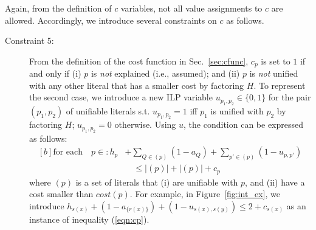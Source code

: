 \documentclass[english]{jnlp_1.4}
\def\P{}
\def\E{}
\def\U{}
\begin{document}
Again, from the definition of $c$ variables, not all value assignments
to $c$ are allowed.
\mbox{Accordingly,} we introduce several constraints on $c$ as follows.
\begin{description}
\item[Constraint 5:] From the definition of the cost function in
  Sec.~\ref{sec:cfunc}, $c_p$ is set to $1$ if and only if (i) $p$ is
  \emph{not} explained (i.e., assumed); and (ii) $p$ is \emph{not}
  unified with any other literal that has a smaller cost by
  factoring $H$. To represent the second case, we introduce a new
  ILP variable $u_{p_1,p_2} \in \{0,1\}$ for the pair $(p_1, p_2)$ of
  unifiable literals s.t. $u_{p_1,p_2} = 1$ iff $p_1$ is unified with
  $p_2$ by factoring $H$; $u_{p_1,p_2} = 0$ otherwise. Using $u$,
  the condition can be expressed as follows:
  \begin{equation}
\begin{aligned}[b]
    \text{for each}\quad p \in \P: h_p & + \sum_{Q \in \E(p)} (1-a_Q) + \sum_{p' \in \U(p)} (1-u_{p,p'}) \\
	& \quad \le |\E(p)|+|\U(p)| + c_p 
\end{aligned}
\label{eqn:cp}
\end{equation}
  where $\U(p)$ is a set of literals that (i) are unifiable with $p$,
  and (ii) have a cost smaller than $cost(p)$.
  For example, in Figure~\ref{fig:int_ex}, we introduce $h_{s(x)} +
  (1-a_{\{r(x)\}}) + (1-u_{s(x),s(y)}) \le 2 + c_{s(x)}$ as an
  instance of inequality (\ref{eqn:cp}).
\end{description}
\end{document}
